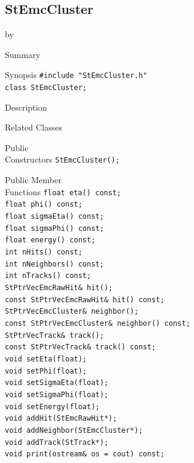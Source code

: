 \documentclass[twoside]{article}
\newcommand{\entrylabel}[1]{\mbox{\textbf{{#1}}}\hfil}%
\newenvironment{entry}
{\begin{list}{}%
    {\renewcommand{\makelabel}{\entrylabel}%
     \setlength{\labelwidth}{90pt}%
     \setlength{\leftmargin}{\labelwidth}
     \advance\leftmargin by \labelsep%
      }%
    }%
  {\end{list}}
\newcommand{\Entrylabel}[1]%
{\raisebox{0pt}[1ex][0pt]{\makebox[\labelwidth][l]%
    {\parbox[t]{\labelwidth}{\hspace{0pt}\textbf{{#1}}}}}}
\newenvironment{Entry}%
{\renewcommand{\entrylabel}{\Entrylabel}\begin{entry}}%
  {\end{entry}}
\begin{document}
\subsection{StEmcCluster}
\label{sec:StEmcCluster}
\begin{Entry}
\item[Summary]
\item[Synopsis]
    \verb+#include "StEmcCluster.h"+\\
    \verb+class StEmcCluster;+\\
\item[Description]
\item[Related Classes]
\item[Public\\ Constructors]
    \verb+StEmcCluster();+\\
\item[Public Member\\ Functions]
    \verb+float eta() const;+\\
    \verb+float phi() const;+\\
    \verb+float sigmaEta() const;+\\
    \verb+float sigmaPhi() const;+\\
    \verb+float energy() const;+\\
    \verb+int nHits() const; +\\
    \verb+int nNeighbors() const;+\\
    \verb+int nTracks() const;+\\
    \verb+StPtrVecEmcRawHit& hit();+\\
    \verb+const StPtrVecEmcRawHit& hit() const;+\\
    \verb+StPtrVecEmcCluster& neighbor();+\\
    \verb+const StPtrVecEmcCluster& neighbor() const;+\\
    \verb+StPtrVecTrack& track();+\\
    \verb+const StPtrVecTrack& track() const;+\\
    \verb+void setEta(float);+\\
    \verb+void setPhi(float);+\\
    \verb+void setSigmaEta(float);+\\
    \verb+void setSigmaPhi(float);+\\
    \verb+void setEnergy(float);+\\
    \verb+void addHit(StEmcRawHit*);+\\
    \verb+void addNeighbor(StEmcCluster*);+\\
    \verb+void addTrack(StTrack*);+\\
    \verb+void print(ostream& os = cout) const;+\\
\end{Entry}
\clearpage
\end{document}
